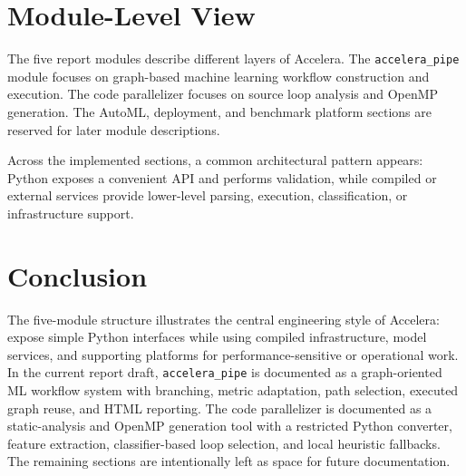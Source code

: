 \documentclass[11pt,a4paper]{article}
\newcommand{\project}{Accelera}
\begin{document}
\section{Module-Level View}

The five report modules describe different layers of \project{}. The
\texttt{accelera\_pipe} module focuses on graph-based machine learning
workflow construction and execution. The code parallelizer focuses on source
loop analysis and OpenMP generation. The AutoML, deployment, and benchmark
platform sections are reserved for later module descriptions.

Across the implemented sections, a common architectural pattern appears:
Python exposes a convenient API and performs validation, while compiled or
external services provide lower-level parsing, execution, classification, or
infrastructure support.

\section{Conclusion}

The five-module structure illustrates the central engineering style of
\project{}: expose simple Python interfaces while using compiled
infrastructure, model services, and supporting platforms for
performance-sensitive or operational work. In the current report draft,
\texttt{accelera\_pipe} is documented as a graph-oriented ML workflow system
with branching, metric adaptation, path selection, executed graph reuse, and
HTML reporting. The code parallelizer is documented as a static-analysis and
OpenMP generation tool with a restricted Python converter, feature extraction,
classifier-based loop selection, and local heuristic fallbacks. The remaining
sections are intentionally left as space for future documentation.
\end{document}
